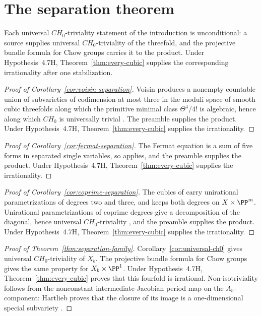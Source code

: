 \section{The separation theorem}
\label{sec:synthesis}

Each universal \(CH_0\)-triviality statement of the introduction is
unconditional: a source supplies universal \(CH_0\)-triviality of the
threefold, and the projective bundle formula for Chow groups carries it to the
product.  Under Hypothesis~4.7H, Theorem~\ref{thm:every-cubic} supplies the
corresponding irrationality after one stabilization.

\begin{proof}[Proof of Corollary~\ref{cor:voisin-separation}]
Voisin produces a nonempty countable union of subvarieties of codimension at
most three in the moduli space of smooth cubic threefolds along which the
primitive minimal class \(\Theta^4/4!\) is algebraic, hence along which
\(CH_0\) is universally trivial \cite[Theorem~4.5 and Lemma~4.6]{Voisin}.
The preamble supplies the product.  Under Hypothesis~4.7H,
Theorem~\ref{thm:every-cubic} supplies the irrationality.
\end{proof}

\begin{proof}[Proof of Corollary~\ref{cor:fermat-separation}]
The Fermat equation is a sum of five forms in separated single variables, so
\cite{CT} applies, and the preamble supplies the product.  Under
Hypothesis~4.7H, Theorem~\ref{thm:every-cubic} supplies the irrationality.
\end{proof}

\begin{proof}[Proof of Corollary~\ref{cor:coprime-separation}]
The cubics of \cite[Theorem~3.3]{YYZ} carry unirational parametrizations of
degrees two and three, and \cite[Corollary~3.5]{YYZ} keeps both degrees on
\(X\times\PP^m\).  Unirational parametrizations of coprime degrees give a
decomposition of the diagonal, hence universal \(CH_0\)-triviality
\cite[Section~1]{YYZ}, and the preamble supplies the product.  Under
Hypothesis~4.7H, Theorem~\ref{thm:every-cubic} supplies the irrationality.
\end{proof}

\begin{proof}[Proof of Theorem~\ref{thm:separation-family}]
Corollary~\ref{cor:universal-ch0} gives universal \(CH_0\)-triviality of
\(X_b\).  The projective bundle formula for Chow groups gives the same
property for \(X_b\times\PP^1\).  Under Hypothesis~4.7H,
Theorem~\ref{thm:every-cubic} proves that
this fourfold is irrational.  Non-isotriviality follows from the nonconstant
intermediate-Jacobian period map on the \(A_5\)-component: Hartlieb proves
that the closure of its image is a one-dimensional special subvariety
\cite[Proposition~5.7]{Hartlieb}.
\end{proof}

